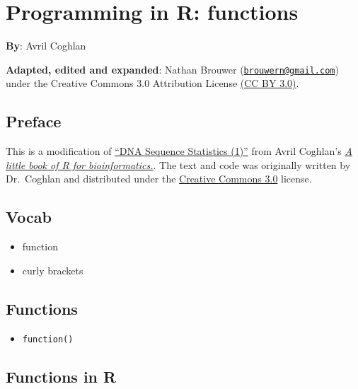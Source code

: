 \documentclass[
]{book}
\providecommand{\tightlist}{%
  \setlength{\itemsep}{0pt}\setlength{\parskip}{0pt}}
\begin{document}
\hypertarget{programming-in-r-functions}{%
\chapter{Programming in R: functions}\label{programming-in-r-functions}}

\textbf{By}: Avril Coghlan

\textbf{Adapted, edited and expanded}: Nathan Brouwer (\href{mailto:brouwern@gmail.com}{\nolinkurl{brouwern@gmail.com}}) under the Creative Commons 3.0 Attribution License \href{https://creativecommons.org/licenses/by/3.0/}{(CC BY 3.0)}.

\hypertarget{preface-5}{%
\section{Preface}\label{preface-5}}

This is a modification of \href{https://a-little-book-of-r-for-bioinformatics.readthedocs.io/en/latest/src/chapter1.html}{``DNA Sequence Statistics (1)''} from Avril Coghlan's \href{https://a-little-book-of-r-for-bioinformatics.readthedocs.io/en/latest/index.html}{\emph{A little book of R for bioinformatics.}}. The text and code was originally written by Dr.~Coghlan and distributed under the \href{https://creativecommons.org/licenses/by/3.0/us/}{Creative Commons 3.0} license.

\hypertarget{vocab-2}{%
\section{Vocab}\label{vocab-2}}

\begin{itemize}
\tightlist
\item
  function
\item
  curly brackets
\end{itemize}

\hypertarget{functions-3}{%
\section{Functions}\label{functions-3}}

\begin{itemize}
\tightlist
\item
  \texttt{function()}
\end{itemize}

\hypertarget{functions-in-r}{%
\section{Functions in R}\label{functions-in-r}}
\end{document}
